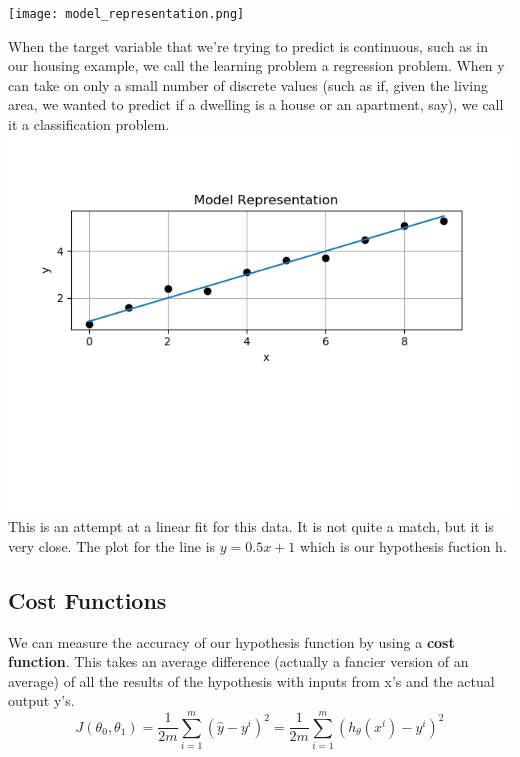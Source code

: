 \texttt{[image: model\_representation.png]}

When the target variable that we’re trying to predict is continuous, such as in our housing example, we call the learning problem a regression problem. When y can take on only a small number of discrete values (such as if, given the living area, we wanted to predict if a dwelling is a house or an apartment, say), we call it a classification problem. \\

\includegraphics{python/model_plot_representation.png}\\

This is an attempt at a linear fit for this data.  It is not quite a match, but it is very close.  The plot for the line is $y=0.5x+1$ which is our hypothesis fuction h. 


\subsection{Cost Functions}

We can measure the accuracy of our hypothesis function by using a \textbf{cost function}. This takes an average difference (actually a fancier version of an average) of all the results of the hypothesis with inputs from x's and the actual output y's. \\

\begin{equation}
J(\theta_{0}, \theta_{1}) = \frac{1}{2m} \sum_{i=1}^{m} (\hat{y} -y^{i})^{2} = \frac{1}{2m} \sum_{i=1}^{m} (h_{\theta}(x^{i})-y^{i})^2
\end{equation}

